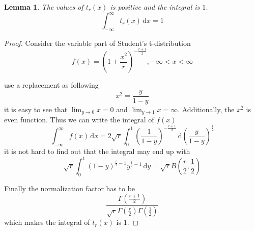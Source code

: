 \documentclass[a4paper]{article}
\newtheorem{lemma}{Lemma}[section]
\begin{document}
\begin{lemma} \label{lemma: The pdf of Student's t-distribution is a pdf}
    The values of $t_r(x)$ is positive and the integral is $1$.
    \begin{equation*}
        \int_{-\infty}^{\infty} t_r(x) \,\mathrm{d}x = 1
    \end{equation*}

\end{lemma}

\begin{proof}
    Consider the variable part of Student's t-distribution
    \begin{equation*}
        f(x) = (1+\frac{x^2}{r})^{-\frac{r+1}{2}}, -\infty < x < \infty
    \end{equation*}

    use a replacement as following
    \begin{equation*}
        x^2 = \frac{y}{1-y}
    \end{equation*}
    it is easy to see that $\lim_{y \to 0} x = 0$ and $\lim_{y \to 1} x = \infty$.
    Additionally, the $x^2$ is even function.
    Thus we can write the integral of $f(x)$
    \begin{equation*}
        \int_{-\infty}^{\infty} f(x) \,\mathrm{d}x =
        2 \sqrt{r} \int_{0}^{1} (\frac{1}{1-y})^{-\frac{r+1}{2}} \,\mathrm{d} (\frac{y}{1-y})^\frac{1}{2}
    \end{equation*}
    it is not hard to find out that the integral may end up with
    \begin{equation*}
        \sqrt{r} \int_{0}^{1} (1-y)^{\frac{r}{2}-1} y^{\frac{1}{2}-1} \,\mathrm{d}y =
        \sqrt{r} B(\frac{r}{2}, \frac{1}{2})
    \end{equation*}

    Finally the normalization factor has to be
    \begin{equation*}
        \frac{\Gamma(\frac{r+1}{2})}{\sqrt{r} \Gamma(\frac{r}{2}) \Gamma(\frac{1}{2})}
    \end{equation*}
    which makes the integral of $t_r(x)$ is $1$.

\end{proof}
\end{document}
